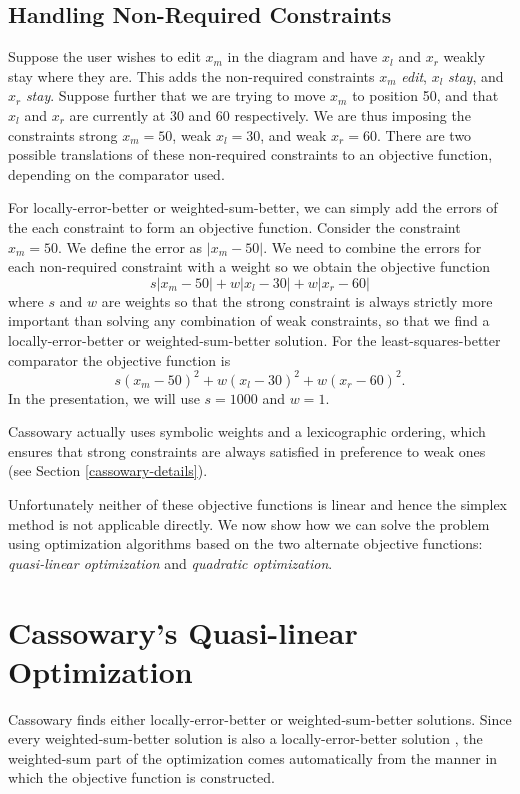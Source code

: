 \documentclass{article}
\newcommand{\strength}{\sf}
\begin{document}
\subsection{Handling Non-Required Constraints}
\label{non-requireds}

Suppose the user wishes to edit $x_m$ in the diagram and have $x_l$ and
$x_r$ weakly stay where they are.  This adds the non-required constraints
$x_m$ {\em edit}, $x_l$ {\em stay}, and $x_r$ {\em stay}.  Suppose further
that we are trying to move $x_m$ to position 50, and that $x_l$ and $x_r$ are
currently at 30 and 60 respectively.  We are thus imposing the constraints
{\strength strong} $x_m = 50$, {\strength weak} $x_l = 30$, and 
{\strength weak} $x_r = 60$.
There are two possible translations of these non-required constraints
to an objective function, depending on the comparator used.

For locally-error-better or weighted-sum-better, we can
simply add the errors of the each constraint to form an objective function.
Consider the constraint $x_m = 50$.  We define the error as $|x_m-50|$\@.  We
need to combine the errors for each non-required constraint with a weight
so we obtain the objective function 
$$s |x_m - 50| + w |x_l - 30| + w |x_r - 60|$$
where $s$ and $w$ are weights so that the strong constraint is always
strictly more important than solving any combination of weak constraints,
so that we find a locally-error-better or weighted-sum-better solution.
For the least-squares-better comparator the objective function is 
$$s (x_m - 50)^2 + w (x_l - 30)^2 + w (x_r - 60)^2.$$  
In the presentation, we will use $s = 1000$ and $w = 1$.

Cassowary actually uses symbolic weights and a lexicographic ordering,
which ensures that strong constraints are always satisfied in preference to
weak ones (see Section \ref{cassowary-details}).

Unfortunately neither of these objective functions is linear and hence the
simplex method is not applicable directly.  We now show how we can 
solve the problem using optimization algorithms
based on the two alternate objective functions: \emph{quasi-linear
optimization} and \emph{quadratic optimization}.

\section{Cassowary's Quasi-linear Optimization}
\label{quasi-linear}

Cassowary finds either locally-error-better or weighted-sum-better
solutions.  Since every weighted-sum-better solution is also a
locally-error-better solution \cite{borning-lisp-symbolic-computation-92},
the weighted-sum part of the optimization comes automatically from the
manner in which the objective function is constructed.
\end{document}
